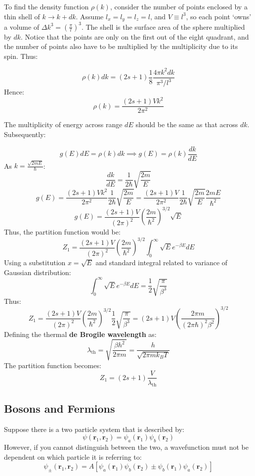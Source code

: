 \documentclass[12pt]{article}
\begin{document}
To find the density function $\rho(k)$, consider the number of points enclosed by a thin shell of $k \to k+dk$. Assume $l_x=l_y=l_z=l$, and $V\equiv l^3$, so each point `owns' a volume of $\Delta k^3 =\left(\frac{\pi}{l}\right)^3$. The shell is the surface area of the sphere multiplied by $dk$. Notice that the points are only on the first out of the eight quadrant, and the number of points also have to be multiplied by the multiplicity due to its spin. Thus:

\[\rho(k)dk = (2s+1)\frac18\frac{4\pi k^2 dk}{\pi^3/l^3}\]
Hence:
\[\boxed{\rho(k) = \frac{(2s+1)Vk^2}{2\pi^2}}\]

The multiplicity of energy across range $dE$ should be the same as that across $dk$. Subsequently:

\[g(E)dE =\rho(k)dk  \implies g(E) = \rho(k)\frac{dk}{dE}\]
As $k = \frac{\sqrt{2mE}}{\hbar}$:
\[ \frac{dk}{dE} = \frac{1}{2\hbar} \sqrt{\frac{2m}{E}}\]
\[g(E) = \frac{(2s+1)Vk^2}{2\pi^2}\frac{1}{2\hbar} \sqrt{\frac{2m}{E}} = \frac{(2s+1)V}{2\pi^2}\frac{1}{2\hbar} \sqrt{\frac{2m}{E}}\frac{2mE}{\hbar^2} \]
\[\boxed{g(E) = \frac{(2s+1)V}{(2\pi)^2}\left(\frac{2m}{\hbar^2}\right)^{3/2}\sqrt{E}}\]
Thus, the partition function would be:
\[Z_1 = \frac{(2s+1)V}{(2\pi)^2}\left(\frac{2m}{\hbar^2}\right)^{3/2}\int^\infty_0 \sqrt{E} e^{-\beta E} dE\]
Using a substitution $x = \sqrt{E}$ and standard integral related to variance of Gaussian distribution:
\[\int^\infty_0 \sqrt{E} e^{-\beta E} dE = \frac12 \sqrt{\frac{\pi}{\beta^3}}\]
Thus:
\[Z_1 = \frac{(2s+1)V}{(2\pi)^2}\left(\frac{2m}{\hbar^2}\right)^{3/2}\frac12 \sqrt{\frac{\pi}{\beta^3}} = (2s+1)V\left(\frac{2\pi m}{(2\pi\hbar)^2\beta^2}\right)^{3/2}\]
Defining the thermal \textbf{de Brogile wavelength} as:
\[\boxed{\lambda_\text{th} = \sqrt{\frac{\beta h^2}{2\pi m}}=\frac{h}{\sqrt{2\pi m k_B T}}}\]
The partition function becomes:
\[\boxed{Z_1 = (2s+1)\frac{V}{\lambda_\text{th}}}\]

\subsection{Bosons and Fermions}

Suppose there is a two particle system that is described by:
\[\psi(\mathbf{r}_1, \mathbf{r}_2) = \psi_a(\mathbf{r}_1)\psi_b(\mathbf{r}_2)\]
However, if you cannot distinguish between the two, a wavefunction must not be dependent on which particle it is referring to:
\[\psi_\pm(\mathbf{r}_1, \mathbf{r}_2) = A[\psi_a(\mathbf{r}_1)\psi_b(\mathbf{r}_2)\pm\psi_b(\mathbf{r}_1)\psi_a(\mathbf{r}_2)]\]
\end{document}
